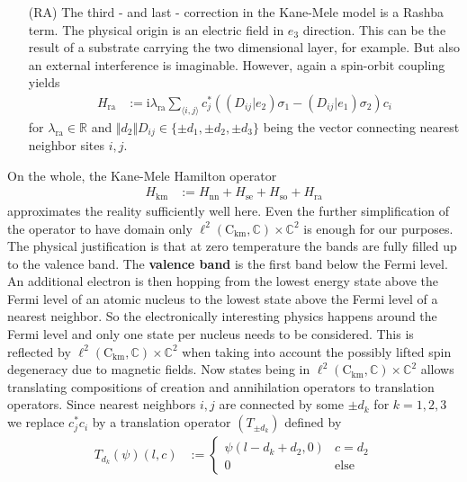 \begin{enumerate}
\item[(RA)]
The third - and last - correction in the Kane-Mele model is a Rashba term. The physical origin is an electric field in $e_{3}$ direction. This can be the result of a substrate carrying the two dimensional layer, for example. But also an external interference is imaginable. However, again a spin-orbit coupling yields
\begin{align*}
  H_{\textrm{ra}}
  &:=
  \mathrm{i}
  \lambda_{\textrm{ra}}
  \sum_{\langle i,j \rangle}
  c_{j}^{\ast}
  ((D_{ij}\vert e_{2})\sigma_{1} - (D_{ij} \vert e_{1})\sigma_{2})
  c_{i}
\end{align*}
for $\lambda_{\textrm{ra}} \in \mathbb{R}$ and $\Vert d_{2} \Vert D_{ij} \in \lbrace \pm d_{1},\pm d_{2},\pm d_{3} \rbrace$ being the vector connecting nearest neighbor sites $i,j$.
\end{enumerate}
On the whole, the Kane-Mele Hamilton operator
\begin{align*}
  H_{\textrm{km}}
  &:=
  H_{\textrm{nn}}
  +
  H_{\textrm{se}}
  +
  H_{\textrm{so}}
  +
  H_{\textrm{ra}}
\end{align*}
approximates the {\glqq}reality{\grqq} sufficiently well here. Even the further simplification of the operator to have domain only $\ell^{2}(\mathrm{C}_{\textrm{km}},\mathbb{C}) \times \mathbb{C}^{2}$ is enough for our purposes. The physical justification is that at zero temperature the bands are fully filled up to the valence band. The \textbf{valence band} is the first band below the Fermi level. An additional electron is then {\glqq}hopping{\grqq} from the lowest energy state above the Fermi level of an atomic nucleus to the lowest state above the Fermi level of a nearest neighbor. So the electronically interesting physics happens around the Fermi level and only one state per nucleus needs to be considered. This is reflected by $\ell^{2}(\mathrm{C}_{\textrm{km}},\mathbb{C}) \times \mathbb{C}^{2}$ when taking into account the possibly lifted spin degeneracy due to magnetic fields. Now states being in $\ell^{2}(\mathrm{C}_{\textrm{km}},\mathbb{C}) \times \mathbb{C}^{2}$ allows translating compositions of creation and annihilation operators to translation operators. Since nearest neighbors $i,j$ are connected by some $\pm d_{k}$ for $k = 1,2,3$ we replace $c_{j}^{\ast}c_{i}$ by a translation operator $(T_{\pm d_{k}})$ defined by
\begin{align*}
  T_{d_{k}}(\psi)(l,c)
  &:=
  \begin{cases}
    \psi(l - d_{k} + d_{2},0)
    &
    c
    =
    d_{2}
    \\
    0
    &
    \text{else}
  \end{cases}
\end{align*}
